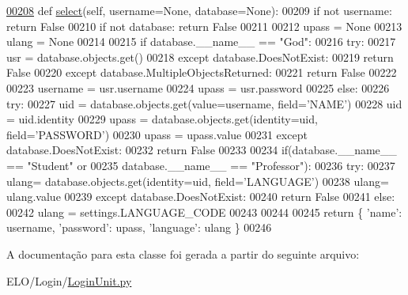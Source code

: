 \begin{DoxyCode}
\hypertarget{classLogin_1_1LoginUnit_1_1PersLogin_l00208}{}\hyperlink{classLogin_1_1LoginUnit_1_1PersLogin_a1847dbd744377283add2327d2eb0b99f}{00208}     \textcolor{keyword}{def }\hyperlink{classLogin_1_1LoginUnit_1_1PersLogin_a1847dbd744377283add2327d2eb0b99f}{select}(self, username=None, database=None):
00209         \textcolor{keywordflow}{if} \textcolor{keywordflow}{not} username: \textcolor{keywordflow}{return} \textcolor{keyword}{False}
00210         \textcolor{keywordflow}{if} \textcolor{keywordflow}{not} database: \textcolor{keywordflow}{return} \textcolor{keyword}{False}
00211 
00212         upass = \textcolor{keywordtype}{None}
00213         ulang = \textcolor{keywordtype}{None}
00214 
00215         \textcolor{keywordflow}{if} database.\_\_name\_\_ == \textcolor{stringliteral}{"God"}:
00216             \textcolor{keywordflow}{try}:
00217                 usr = database.objects.get()
00218             \textcolor{keywordflow}{except} database.DoesNotExist:
00219                 \textcolor{keywordflow}{return} \textcolor{keyword}{False}
00220             \textcolor{keywordflow}{except} database.MultipleObjectsReturned:
00221                 \textcolor{keywordflow}{return} \textcolor{keyword}{False}
00222 
00223             username = usr.username
00224             upass = usr.password
00225         \textcolor{keywordflow}{else}:
00226             \textcolor{keywordflow}{try}:
00227                 uid = database.objects.get(value=username, field=\textcolor{stringliteral}{'NAME'})
00228                 uid = uid.identity
00229                 upass = database.objects.get(identity=uid, field=\textcolor{stringliteral}{'PASSWORD'})
00230                 upass = upass.value
00231             \textcolor{keywordflow}{except} database.DoesNotExist:
00232                 \textcolor{keywordflow}{return} \textcolor{keyword}{False}
00233 
00234             if(database.\_\_name\_\_ == \textcolor{stringliteral}{"Student"} \textcolor{keywordflow}{or} 
00235                database.\_\_name\_\_ == \textcolor{stringliteral}{"Professor"}):
00236                 \textcolor{keywordflow}{try}:
00237                     ulang= database.objects.get(identity=uid, field=\textcolor{stringliteral}{'LANGUAGE'})
00238                     ulang= ulang.value
00239                 \textcolor{keywordflow}{except} database.DoesNotExist:
00240                     \textcolor{keywordflow}{return} \textcolor{keyword}{False}
00241             \textcolor{keywordflow}{else}:
00242                 ulang = settings.LANGUAGE\_CODE
00243 
00244 
00245         \textcolor{keywordflow}{return} \{ \textcolor{stringliteral}{'name'}: username, \textcolor{stringliteral}{'password'}: upass, \textcolor{stringliteral}{'language'}: ulang \}
00246 \end{DoxyCode}


A documentação para esta classe foi gerada a partir do seguinte arquivo\+:\begin{DoxyCompactItemize}
\item 
E\+L\+O/\+Login/\hyperlink{LoginUnit_8py}{Login\+Unit.\+py}\end{DoxyCompactItemize}
